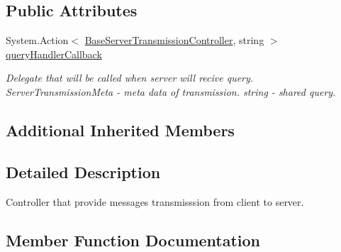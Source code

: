 \subsection*{Public Attributes}
\begin{DoxyCompactItemize}
\item 
System.\+Action$<$ \mbox{\hyperlink{class_pipes_provider_1_1_server_1_1_transmission_controllers_1_1_base_server_transmission_controller}{Base\+Server\+Transmission\+Controller}}, string $>$ \mbox{\hyperlink{class_pipes_provider_1_1_server_1_1_transmission_controllers_1_1_client_to_server_transmission_controller_a7f1552d5fea75a49edc81af944630f3e}{query\+Handler\+Callback}}
\begin{DoxyCompactList}\small\item\em Delegate that will be called when server will recive query. Server\+Transmission\+Meta -\/ meta data of transmission. string -\/ shared query. \end{DoxyCompactList}\end{DoxyCompactItemize}
\subsection*{Additional Inherited Members}


\subsection{Detailed Description}
Controller that provide message\textquotesingle{}s transmisssion from client to server. 



\subsection{Member Function Documentation}
\mbox{\label{class_pipes_provider_1_1_server_1_1_transmission_controllers_1_1_client_to_server_transmission_controller_a9e11d59cc7f44eee700d002df9d4f580}} 
